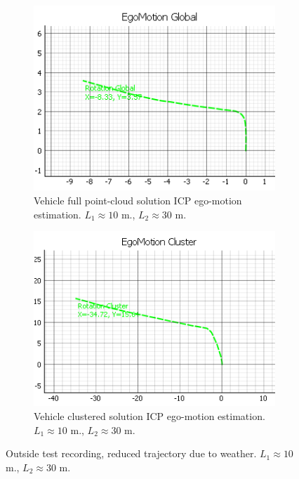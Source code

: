 \begin{figure}[!htbp]
    \centering
    \begin{subfigure}{0.48\linewidth}
        \centering
        \includegraphics[width=\linewidth]{images/ICPOutside_Full4.png}
        \caption{Vehicle full point-cloud solution ICP ego-motion estimation. $L_1 \approx 10$ m., $L_2 \approx 30$ m. }
        \label{fig:odometryFull4}
    \end{subfigure}
    \hfill
    \begin{subfigure}{0.48\linewidth}
        \centering
        \includegraphics[width=\linewidth]{images/ICPOutside_Cluster4.png}
        \caption{Vehicle clustered solution ICP ego-motion estimation. $L_1 \approx 10$ m., $L_2 \approx 30$ m. }
        \label{fig:odometryCluster4}
    \end{subfigure}
    \caption{Outside test recording, reduced trajectory due to weather. $L_1 \approx 10$ m., $L_2 \approx 30$ m. }
    \label{fig:outsideOdometry4}
\end{figure}

